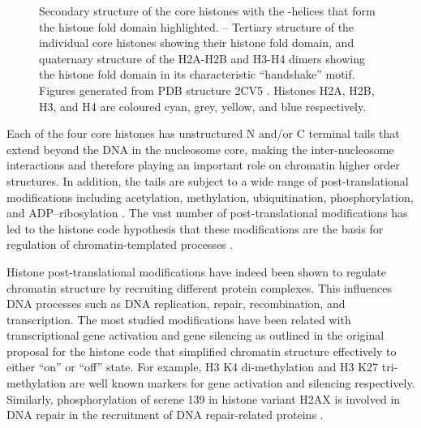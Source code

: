 \begin{figure}
                     {
                       Secondary structure of the core histones with
                       the \textalpha-helices that form the histone
                       fold domain highlighted.
                       --%
                       Tertiary structure of the individual core
                       histones showing their histone fold domain, and
                       quaternary structure of the H2A-H2B and H3-H4
                       dimers showing the histone fold domain in its
                       characteristic ``handshake'' motif.  Figures
                       generated from PDB structure 2CV5
                       \citep{tsunaka2005-2cv5}.  Histones H2A, H2B,
                       H3, and H4 are coloured cyan, grey, yellow, and
                       blue respectively.}
        \label{fig:intro:histone-fold-domain}
      \end{figure}


      Each of the four core histones has unstructured N and/or C
      terminal tails that extend beyond the DNA in the nucleosome core,
      making the inter-nucleosome interactions and therefore
      playing an important
      role on chromatin higher order structures.
      In addition, the tails are subject to a wide range of
      post-translational modifications
      including acetylation, methylation, ubiquitination, phosphorylation,
      and ADP--ribosylation \citep{bannister2011ptm-review}.
      The vast number of post-translational modifications has led to the
      histone code hypothesis that these modifications are the basis for
      regulation of chromatin-templated processes \citep{jenuwein200histone-code}.


      Histone post-translational modifications have indeed been shown to
      regulate chromatin structure
      by recruiting different protein complexes.
      This influences
      DNA processes such as DNA replication, repair, recombination,
      and transcription.
      The most studied modifications have been related with transcriptional
      gene activation and gene silencing as outlined in
      the original proposal for the histone code \citep{jenuwein200histone-code}
      that simplified chromatin structure
      effectively to either ``on'' or ``off'' state.
      For example,
      H3 K4 di-methylation and H3 K27 tri-methylation are well known
      markers for gene activation and silencing respectively.
      Similarly,
      phosphorylation of serene 139 in histone variant H2AX
      is involved in DNA repair
      in the recruitment of DNA repair-related proteins
      \citep{our-H2AX-review}.

